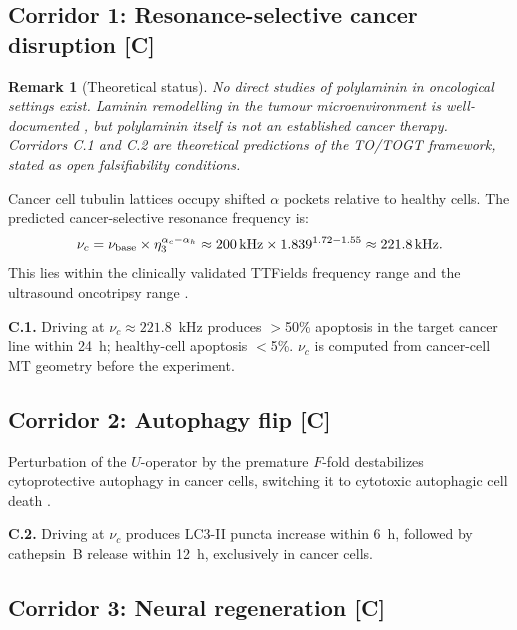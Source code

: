 \documentclass[12pt,a4paper]{article}
\newtheorem{remark}[theorem]{Remark}
\newcommand{\etatrib}{\eta_3}
\begin{document}
\subsection{Corridor 1: Resonance-selective cancer disruption \textbf{[C]}}

\begin{remark}[Theoretical status]
No direct studies of polylaminin in oncological settings exist.
Laminin remodelling in the tumour microenvironment is well-documented
\cite{henke2020}, but polylaminin itself is not an established cancer
therapy. Corridors C.1 and C.2 are theoretical predictions of the
TO/TOGT framework, stated as open falsifiability conditions.
\end{remark}

Cancer cell tubulin lattices occupy shifted $\alpha$ pockets relative to
healthy cells. The predicted cancer-selective resonance frequency is:
\[
\nu_c = \nu_{\rm base}\times\etatrib^{\alpha_c-\alpha_h}
\approx 200\,\mathrm{kHz}\times 1.839^{1.72-1.55}
\approx 221.8\,\mathrm{kHz}.
\]
This lies within the clinically validated TTFields frequency range
\cite{kirson2007} and the ultrasound oncotripsy range \cite{lafond2022}.

\begin{falsbox}
\textbf{C.1.} Driving at $\nu_c\approx 221.8$~kHz produces $>$50\%
apoptosis in the target cancer line within 24~h; healthy-cell apoptosis
$<$5\%. $\nu_c$ is computed from cancer-cell MT geometry before the
experiment.
\end{falsbox}

\subsection{Corridor 2: Autophagy flip \textbf{[C]}}

Perturbation of the $U$-operator by the premature $F$-fold destabilizes
cytoprotective autophagy in cancer cells, switching it to cytotoxic
autophagic cell death \cite{zhao2019}.

\begin{falsbox}
\textbf{C.2.} Driving at $\nu_c$ produces LC3-II puncta increase within
6~h, followed by cathepsin~B release within 12~h, exclusively in cancer
cells.
\end{falsbox}

\subsection{Corridor 3: Neural regeneration \textbf{[C]}}
\end{document}
